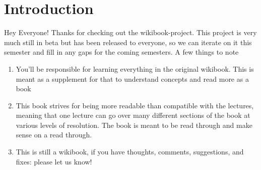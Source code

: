 \chapter{Introduction}

Hey Everyone! Thanks for checking out the wikibook-project. This project is very much still in beta but has been released to everyone, so we can iterate on it this semester and fill in any gaps for the coming semesters. A few things to note

\begin{enumerate}
	\item You'll be responsible for learning everything in the original wikibook. This is meant as a supplement for that to understand concepts and read more as a book
	\item This book strives for being more readable than compatible with the lectures, meaning that one lecture can go over many different sections of the book at various levels of resolution. The book is meant to be read through and make sense on a read through.
	\item This is still a wikibook, if you have thoughts, comments, suggestions, and fixes: please let us know!
\end{enumerate}